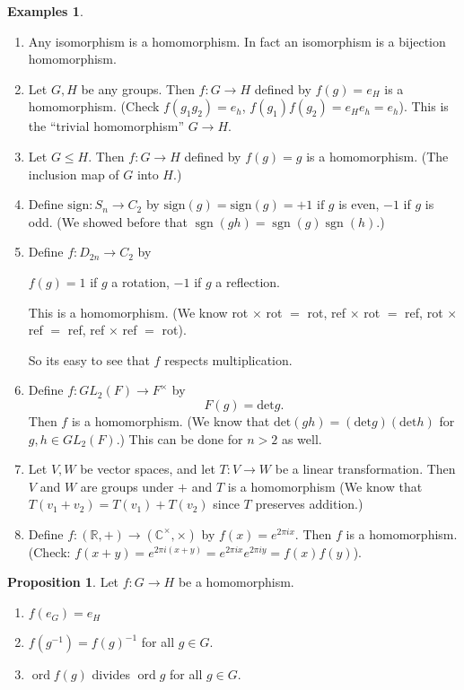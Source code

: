 \documentclass{article}
\theoremstyle{definition}
\newtheorem{proposition}[theorem]{Proposition}
\newtheorem*{exmps}{Examples}
\DeclareMathOperator{\sgn}{sgn}
\DeclareMathOperator{\ord}{\text{ord}}
\begin{document}
\begin{exmps}\hfill
\begin{enumerate}
  \item Any isomorphism is a homomorphism. In fact an isomorphism is a bijection homomorphism.
  \item Let $G,H$ be any groups. Then
    $f : G \rightarrow H$ defined by $f(g) = e_H$ is a homomorphism. (Check $f(g_1 g_2)=e_h$, $f(g_1)f(g_2)=e_He_h = e_h$). This is the ``trivial homomorphism'' $G \rightarrow H.$
  \item Let $G \leq H$. Then $f:G\rightarrow H$ defined by $f(g)=g$ is a homomorphism. (The inclusion map of $G$ into $H$.)
  \item Define $\text{sign}:S_n \rightarrow C_2$ by $\text{sign}(g)=\text{sign}(g)=+1 \text{ if } g $ is even, $-1$ if $g$ is odd. (We showed before that $\sgn(gh)=\sgn(g)\sgn(h)$.)
  \item Define $f:D_{2n} \rightarrow C_2$ by 

    $f(g)=1$ if $g$ a rotation, $-1$ if $g$ a reflection.

    This is a homomorphism. (We know rot $\times$ rot $=$ rot, ref $\times$ rot $=$ ref, rot $\times$ ref $=$ ref, ref $\times$ ref $=$ rot).

    So its easy to see that $f$ respects multiplication.

  \item Define $f:GL_2(F) \rightarrow F^\times$ by
    $$F(g) = \text{det}g.$$ Then $f$ is a homomorphism. 
    (We know that $\text{det}(gh)=(\text{det}g)(\text{det}h)$ for $g,h \in GL_2(F)$.) This can be done for $n>2$ as well.
  \item Let $V,W$ be vector spaces, and let $T:V \rightarrow W$ be a linear transformation. Then $V$ and $W$ are groups under $+$ and $T$ is a homomorphism (We know that $T(v_1 + v_2)=T(v_1)+T(v_2)$ since $T$ preserves addition.) 
  \item Define $f: (\mathbb{R},+)\rightarrow (\mathbb{C}^\times,\times)$ by $f(x)=e^{2 \pi i x}.$ Then $f$ is a homomorphism. (Check: $f(x+y)=e^{2\pi i (x+y)}=e^{2\pi i x}e^{2 \pi i y}=f(x)f(y)$).\\
\end{enumerate}
  
\end{exmps}


\begin{proposition}
  Let $f: G \rightarrow H$ be a homomorphism. 
  \begin{enumerate}
    \item $f(e_G)=e_H$
    \item $f(g^{-1})=f(g)^{-1}$ for all $g \in G$.
    \item $\ord f(g)$ divides $\ord g$ for all $g \in G$.
  \end{enumerate}
\end{proposition}
\end{document}

